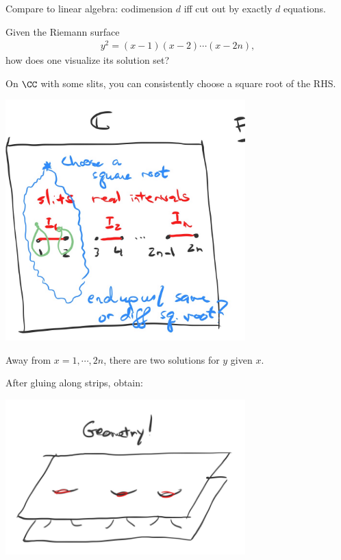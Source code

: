 Compare to linear algebra: codimension \(d\) iff cut out by exactly
\(d\) equations.

\begin{example}

Given the Riemann surface
\begin{align*}  
y^2 = (x-1)(x-2)\cdots(x-2n)
,\end{align*} how does one visualize its solution set?

\end{example}

\begin{fact}

On \(\CC\) with some slits, you can consistently choose a square root of
the RHS.

\includegraphics[width=3.64583in,height=\textheight]{figures/image_2020-08-21-01-31-47.png}

Away from \(x=1, \cdots, 2n\), there are two solutions for \(y\) given
\(x\).

After gluing along strips, obtain:

\includegraphics[width=3.64583in,height=\textheight]{figures/image_2020-08-21-01-32-48.png}

\end{fact}


